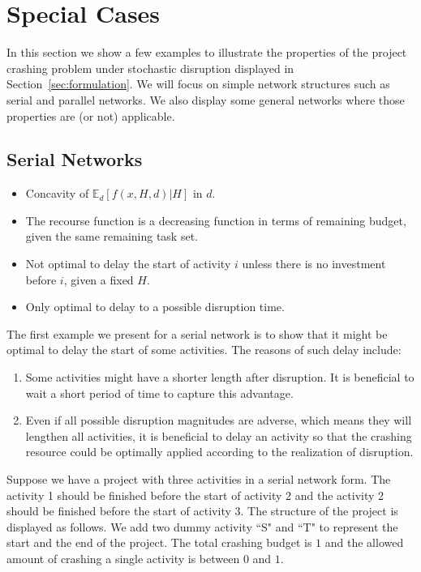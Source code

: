 \documentclass[11pt]{article}
\begin{document}
\section{Special Cases} \label{sec:examples}
	In this section we show a few examples to illustrate the properties of the project crashing problem under stochastic disruption displayed in Section~\ref{sec:formulation}. We will focus on simple network structures such as serial and parallel networks. We also display some general networks where those properties are (or not) applicable.
	\subsection{Serial Networks}
		\begin{itemize}
			\item Concavity of \(\mathbb{E}_d \left[ f(x,H,d) | H \right]\) in \(d\).
			\item The recourse function is a decreasing function in terms of remaining budget, given the same remaining task set.
			\item Not optimal to delay the start of activity \(i\) unless there is no investment before \(i\), given a fixed \(H\).
			\item Only optimal to delay to a possible disruption time.
		\end{itemize}
		The first example we present for a serial network is to show that it might be optimal to delay the start of some activities. The reasons of such delay include:
		\begin{enumerate}
			\item Some activities might have a shorter length after disruption. It is beneficial to wait a short period of time to capture this advantage.
			\item Even if all possible disruption magnitudes are adverse, which means they will lengthen all activities, it is beneficial to delay an activity so that the crashing resource could be optimally applied according to the realization of disruption.
		\end{enumerate}
		Suppose we have a project with three activities in a serial network form. The activity 1 should be finished before the start of activity 2 and the activity 2 should be finished before the start of activity 3. The structure of the project is displayed as follows. We add two dummy activity ``S" and ``T" to represent the start and the end of the project. The total crashing budget is \(1\) and the allowed amount of crashing a single activity is between \(0\) and \(1\). 
\end{document}
